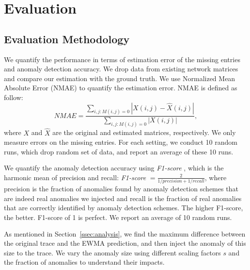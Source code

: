 
\section{Evaluation}
\label{sec:eval}

\subsection{Evaluation Methodology}
\label{ssec:eval-method}

 We quantify the performance in terms of estimation error of the missing entries and anomaly detection accuracy. We drop data from existing network matrices and compare our estimation with the ground truth. We use Normalized Mean Absolute
Error (NMAE) to quantify the estimation error. NMAE is defined as follow:
\begin{equation}
 NMAE = \frac{\sum_{i,j: M(i,j)=0} |X(i,j) - \hat{X}(i,j) |}{
  \sum_{i,j: M(i,j)=0} |X(i,j)|} , 
\end{equation}
where $X$ and $\hat{X}$ are the original and estimated matrices, respectively. We only measure errors on the
missing entries. For each setting, we conduct 10 random runs, which
drop random set of data, and report an average of these 10 runs.

We quantify the anomaly detection accuracy using {\em F1-score}
\cite{wiki:F-score}, which is the harmonic mean of precision and
recall: {\em F1-score} $ = \frac{2}{1/precision + 1/recall}$, where
precision is the fraction of anomalies found by anomaly detection
schemes that are indeed real anomalies we injected and recall is the
fraction of real anomalies that are correctly identified by anomaly
detection schemes. The higher F1-score, the better. F1-score of 1 is
perfect. We report an average of 10 random runs.


 As mentioned in
Section~\ref{ssec:analysis}, we find the maximum difference
between the original trace and the EWMA prediction, and then inject
the anomaly of this size to the trace. We vary the anomaly size using
different scaling factors $s$ and the fraction of anomalies to understand their
impacts. %

